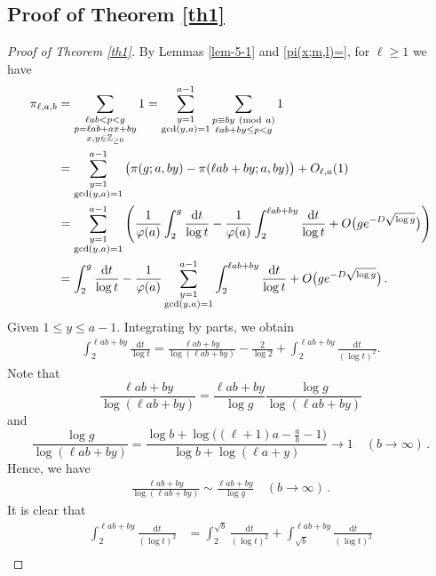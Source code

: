 \documentclass[12pt,a4paper,reqno]{amsart}
\numberwithin{equation}{section}
\def\pmod #1{\ ({\rm{mod}}\ #1)}
\def\d{{\mathrm{d}}}
\theoremstyle{plain}
\theoremstyle{definition}
\begin{document}
\subsection{Proof of Theorem \ref{th1}}
 \begin{proof}[Proof of Theorem \ref{th1}]
 	By Lemmas \ref{lem-5-1} and \ref{pi(x;m,l)=}, for $\ell\geq 1$ we have
 	\begin{align*} 
 		\pi_{\ell,a,b}
 		&=\sum_{\substack{\ell a b<p<g\\p=\ell a b+a x+b y\\x,y\in\mathbb Z_{\ge 0}}}1
 		=\sum_{\substack{y=1\\ \gcd(y,a)=1}}^{a-1}\sum_{\substack{p\equiv b y\pmod{a}\\\ell a b+b y\le p<g}}1\\
 		&=\sum_{\substack{y=1\\\gcd(y,a)=1}}^{a-1}\big(\pi(g;a,b y)-\pi(\ell a b+b y; a, b y)\big)+O_{\ell,a}(1)\\ 
 		&=\sum_{\substack{y=1\\\gcd(y,a)=1}}^{a-1}\left(\frac{1}{\varphi(a)}\int_2^{g}\frac{\d t}{\log t}
 		-\frac{1}{\varphi(a)}\int_2^{\ell a b+b y}\frac{\d t}{\log t}+O\big(g e^{-D\sqrt{\log g}}\big) \right)\\ 
 		&=\int_2^{g}\frac{\d t}{\log t}-\frac{1}{\varphi(a)}\sum_{\substack{y=1\\\gcd(y,a)=1}}^{a-1}\int_2^{\ell a b+b y}\frac{\d t}{\log t}+O\big(g e^{-D\sqrt{\log g}}\big)\,.
 	\end{align*}  
 	Given $1\le y\le a-1$. Integrating by parts, we obtain
 	\begin{align}\label{thm-1-eq-1}
 	\int_2^{\ell a b+b y}\frac{\d t}{\log t}=\frac{\ell a b+b y}{\log(\ell a b+b y)}-\frac{2}{\log 2}+\int_2^{\ell a b+b y}\frac{\d t}{(\log t)^{2}}.
 	\end{align}
 	Note that
 	$$
 	\frac{\ell a b+b y}{\log(\ell a b+b y)}=\frac{\ell a b+b y}{\log g}\frac{\log g}{\log(\ell a b+b y)}
 	$$ 
 	and 
 	$$
 	\frac{\log g}{\log(\ell a b+b y)}=\frac{\log b+\log\bigl((\ell+1)a-\frac{a}{b}-1\bigr)}{\log b+\log(\ell a+y)}\to 1\quad(b\to\infty)\,. 
 	$$ 
 	Hence, we have 
 	\begin{align}\label{thm-1-eq-2}
 		\frac{\ell ab+by}{\log(\ell ab+by)} \sim \frac{\ell ab+by}{\log g} \quad (b\to \infty)\,.
 	\end{align}
 	It is clear that
 	\begin{align*}
 		\int_2^{\ell a b+b y}\frac{\d t}{(\log t)^{2}}&=\int_2^{\sqrt{b}}\frac{\d t}{(\log t)^{2}}+\int_{\sqrt{b}}^{\ell a b+b y}\frac{\d t}{(\log t)^{2}}\\

\end{align*}
\end{proof}
\end{document}
